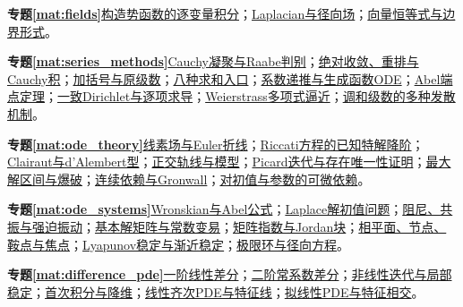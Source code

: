 \par\noindent\textbf{专题\ref{mat:fields}}\quad \hyperref[mat:fields:potential]{构造势函数的逐变量积分}；\hyperref[mat:fields:laplacian]{Laplacian与径向场}；\hyperref[mat:fields:curlgrad]{向量恒等式与边界形式}。\par
\par\noindent\textbf{专题\ref{mat:series_methods}}\quad \hyperref[mat:series_methods:condense]{Cauchy凝聚与Raabe判别}；\hyperref[mat:series_methods:rearrange]{绝对收敛、重排与Cauchy积}；\hyperref[mat:series_methods:group]{加括号与原级数}；\hyperref[mat:series_methods:eight]{八种求和入口}；\hyperref[mat:series_methods:odegen]{系数递推与生成函数ODE}；\hyperref[mat:series_methods:abel]{Abel端点定理}；\hyperref[mat:series_methods:diruniform]{一致Dirichlet与逐项求导}；\hyperref[mat:series_methods:weierstrass]{Weierstrass多项式逼近}；\hyperref[mat:series_methods:harmonic]{调和级数的多种发散机制}。\par
\par\noindent\textbf{专题\ref{mat:ode_theory}}\quad \hyperref[mat:ode_theory:direction]{线素场与Euler折线}；\hyperref[mat:ode_theory:riccati]{Riccati方程的已知特解降阶}；\hyperref[mat:ode_theory:clairaut]{Clairaut与d’Alembert型}；\hyperref[mat:ode_theory:trajectory]{正交轨线与模型}；\hyperref[mat:ode_theory:picard]{Picard迭代与存在唯一性证明}；\hyperref[mat:ode_theory:extension]{最大解区间与爆破}；\hyperref[mat:ode_theory:dependence]{连续依赖与Gronwall}；\hyperref[mat:ode_theory:variation]{对初值与参数的可微依赖}。\par
\par\noindent\textbf{专题\ref{mat:ode_systems}}\quad \hyperref[mat:ode_systems:wronskian]{Wronskian与Abel公式}；\hyperref[mat:ode_systems:laplaceode]{Laplace解初值问题}；\hyperref[mat:ode_systems:oscillation]{阻尼、共振与强迫振动}；\hyperref[mat:ode_systems:fundamental]{基本解矩阵与常数变易}；\hyperref[mat:ode_systems:jordan]{矩阵指数与Jordan块}；\hyperref[mat:ode_systems:phase]{相平面、节点、鞍点与焦点}；\hyperref[mat:ode_systems:lyapunov]{Lyapunov稳定与渐近稳定}；\hyperref[mat:ode_systems:cycle]{极限环与径向方程}。\par
\par\noindent\textbf{专题\ref{mat:difference_pde}}\quad \hyperref[mat:difference_pde:difference1]{一阶线性差分}；\hyperref[mat:difference_pde:difference2]{二阶常系数差分}；\hyperref[mat:difference_pde:nonlinear]{非线性迭代与局部稳定}；\hyperref[mat:difference_pde:firstintegral]{首次积分与降维}；\hyperref[mat:difference_pde:transport]{线性齐次PDE与特征线}；\hyperref[mat:difference_pde:quasilinear]{拟线性PDE与特征相交}。\par
